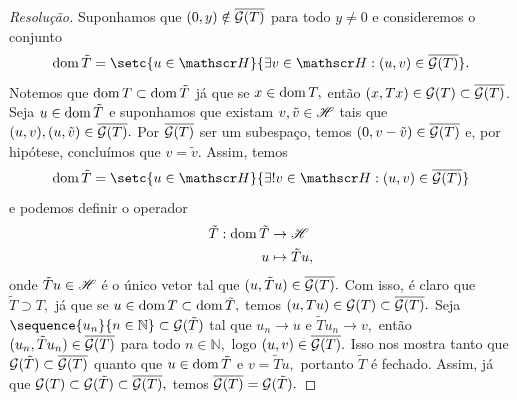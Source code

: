 \begin{proof}[Resolução]
  Suponhamos que \((0,y) \notin \overline{\mathcal{G}(T)}\) para todo \(y \neq 0\) e consideremos o conjunto
  \begin{equation*}
    \dom{\tilde{T}} = \setc{u \in \hilbert}{\exists v \in \hilbert : (u,v) \in \closure{\graph{T}}}.
  \end{equation*}
  Notemos que \(\operatorname{dom}{T} \subset \operatorname{dom}{\tilde{T}}\) já que se \(x \in \operatorname{dom}{T},\) então \((x, Tx) \in \mathcal{G}(T) \subset \overline{\mathcal{G}(T)}\). Seja \(u \in \operatorname{dom}{\tilde{T}}\) e suponhamos que existam \(v, \tilde{v} \in \mathscr{H}\) tais que \((u, v), (u, \tilde{v}) \in \overline{\mathcal{G}(T)}.\) Por \(\overline{\mathcal{G}(T)}\) ser um subespaço, temos \((0, v - \tilde{v}) \in \overline{\mathcal{G}(T)}\) e, por hipótese, concluímos que \(v = \tilde{v}.\) Assim, temos
  \begin{equation*}
    \dom{\tilde{T}} = \setc{u \in \hilbert}{\exists! v \in \hilbert : (u, v) \in \closure{\graph{T}}}
  \end{equation*}
  e podemos definir o operador
  \begin{align*}
    \tilde{T} : \operatorname{dom}{\tilde{T}} &\to \mathscr{H}\\
                              u &\mapsto \tilde{T}u,
  \end{align*}
  onde \(\tilde{T}u \in \mathscr{H}\) é o único vetor tal que \((u, \tilde{T}u) \in \overline{\mathcal{G}(T)}.\) Com isso, é claro que \(\tilde{T} \supset T,\) já que se \(u \in \operatorname{dom}{T} \subset \operatorname{dom}{\tilde{T}},\) temos \((u, Tu) \in \mathcal{G}(T) \subset \overline{\mathcal{G}(T)}.\) Seja \(\sequence{u_n}{n\in\mathbb{N}} \subset \graph{\tilde{T}}\) tal que \(u_n \to u\) e \(\tilde{T}u_n \to v,\) então \((u_n, \tilde{T}u_n) \in \overline{\mathcal{G}(T)}\) para todo \(n \in \mathbb{N},\) logo \((u, v) \in \overline{\mathcal{G}(T)}.\) Isso nos mostra tanto que \(\mathcal{G}(\tilde{T}) \subset \overline{\mathcal{G}(T)}\) quanto que \(u \in \operatorname{dom}{\tilde{T}}\) e \(v = \tilde{T}u,\) portanto \(\tilde{T}\) é fechado. Assim, já que \(\mathcal{G}(T) \subset \mathcal{G}(\tilde{T}) \subset \overline{\mathcal{G}(T)},\) temos \(\overline{\mathcal{G}(T)} = \mathcal{G}(\tilde{T}).\)
\end{proof}
